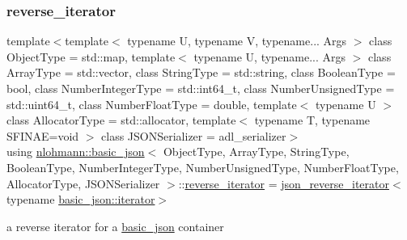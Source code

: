 \subsubsection{\texorpdfstring{reverse\_iterator}{reverse\_iterator}}
{\footnotesize\ttfamily template$<$template$<$ typename U, typename V, typename... Args $>$ class Object\+Type = std\+::map, template$<$ typename U, typename... Args $>$ class Array\+Type = std\+::vector, class String\+Type  = std\+::string, class Boolean\+Type  = bool, class Number\+Integer\+Type  = std\+::int64\+\_\+t, class Number\+Unsigned\+Type  = std\+::uint64\+\_\+t, class Number\+Float\+Type  = double, template$<$ typename U $>$ class Allocator\+Type = std\+::allocator, template$<$ typename T, typename S\+F\+I\+N\+A\+E=void $>$ class J\+S\+O\+N\+Serializer = adl\+\_\+serializer$>$ \\
using \mbox{\hyperlink{classnlohmann_1_1basic__json}{nlohmann\+::basic\+\_\+json}}$<$ Object\+Type, Array\+Type, String\+Type, Boolean\+Type, Number\+Integer\+Type, Number\+Unsigned\+Type, Number\+Float\+Type, Allocator\+Type, J\+S\+O\+N\+Serializer $>$\+::\mbox{\hyperlink{classnlohmann_1_1basic__json_ac223d5560c2b05a208c88de67376c5f2}{reverse\+\_\+iterator}} =  \mbox{\hyperlink{classnlohmann_1_1basic__json_1_1json__reverse__iterator}{json\+\_\+reverse\+\_\+iterator}}$<$typename \mbox{\hyperlink{classnlohmann_1_1basic__json_a099316232c76c034030a38faa6e34dca}{basic\+\_\+json\+::iterator}}$>$}



a reverse iterator for a \mbox{\hyperlink{classnlohmann_1_1basic__json}{basic\+\_\+json}} container 

\mbox{\label{classnlohmann_1_1basic__json_a39f2cd0b58106097e0e67bf185cc519b}} 
